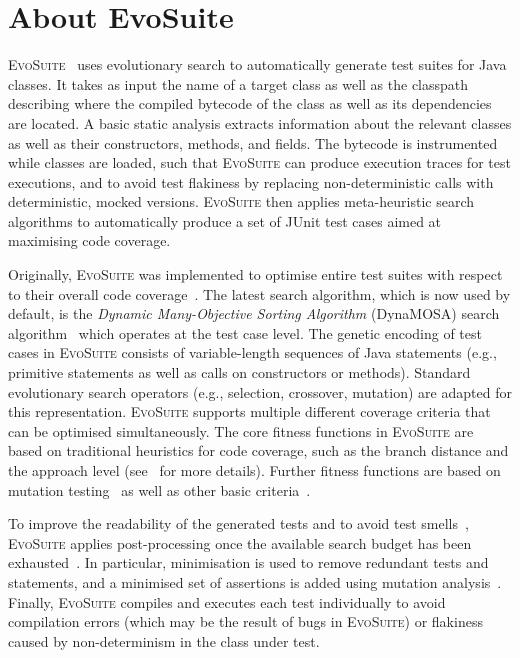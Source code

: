 \documentclass[10pt,conference]{IEEEtran}
\newcommand{\EVOSUITE}{\textsc{EvoSuite}\xspace}
\begin{document}
\section{About EvoSuite}


\EVOSUITE~\cite{FrA11c} uses evolutionary search to automatically generate test
suites for Java classes. It takes as input the name of a target class as well
as the classpath describing where the compiled bytecode of the class as well as
its dependencies are located. A basic static analysis extracts information
about the relevant classes as well as their constructors, methods, and fields.
The bytecode is instrumented while classes are loaded, such that \EVOSUITE can
produce execution traces for test executions, and to avoid test flakiness by
replacing non-deterministic calls with deterministic, mocked versions.
\EVOSUITE then applies meta-heuristic search algorithms to automatically
produce a set of JUnit test cases aimed at maximising code coverage.


Originally, \EVOSUITE was implemented to optimise entire test suites with
respect to their overall code coverage~\cite{GoA_TSE12}. The latest search algorithm, which is now used by default, is the \textit{Dynamic Many-Objective Sorting Algorithm} (DynaMOSA) search algorithm~\cite{dynamosa} which operates at the test case level. 
%
The genetic encoding of test cases in \EVOSUITE consists of variable-length sequences of Java statements (e.g., primitive statements as well as calls on constructors or methods). Standard evolutionary search operators (e.g., selection, crossover, mutation) are adapted for this representation. 
%
\EVOSUITE supports multiple different coverage criteria that can be optimised simultaneously. The core fitness functions in \EVOSUITE are based on traditional heuristics for code coverage, such as the branch distance and the approach level (see~\cite{GoA_TSE12} for more details). Further fitness functions are based on mutation testing~\cite{emse14_mutation} as well as other basic criteria~\cite{rojas2015combining}.


To improve the readability of the generated tests and to avoid test smells~\cite{panichella2020revisiting}, \EVOSUITE applies post-processing once the available search budget has been exhausted~\cite{FrA11c,FrA13a}. In particular, minimisation is used to remove redundant tests and statements, and a minimised set of assertions is added using mutation analysis~\cite{10.1109/TSE.2011.93}. Finally, \EVOSUITE compiles and executes each test individually to avoid compilation errors (which may be the result of bugs in \EVOSUITE) or flakiness caused by non-determinism in the class under test.
\end{document}
